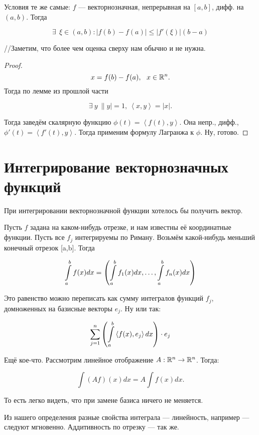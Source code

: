 \documentclass[12pt]{report}
\begin{document}
\begin{thm}
Условия те же самые: $f$ --- векторнозначная, непрерывная на $[a,b]$, дифф. на $(a,b)$. Тогда

$$\exists \ \ \xi \in (a,b) : |f(b)-f(a)| \le |f'(\xi)|(b-a)$$

//Заметим, что более чем оценка сверху нам обычно и не нужна.
\end{thm}
\begin{proof}
$$x = f(b)-f(a),\ \ x \in \mathbb{R}^n.$$
Тогда по лемме из прошлой части

$$\exists \ y\ \|y|=1,\ \left<x,y\right>=|x|.$$

Тогда заведём скалярную функцию $\phi(t) = \left<f(t),y\right>$. Она непр., дифф., $\phi'(t) = \left<f'(t),y\right>$. Тогда применим формулу Лагранжа к $\phi$. Ну, готово.
\end{proof}

\section{Интегрирование векторнозначных функций}

При интегрировании векторнозначной функции хотелось бы получить вектор.

\begin{defn}
Пусть $f$ задана на каком-нибудь отрезке, и нам известны её координатные функции. Пусть все $f_j$ интегрируемы по Риману. Возьмём какой-нибудь меньший конечный отрезок [a,b]. Тогда

$$\int\limits_{a}^{b}{f(x)dx}= \left(\int\limits_{a}^{b}{f_1(x)dx},\ldots,\int\limits_{a}^{b}{f_n(x)dx}\right)$$

Это равенство можно переписать как сумму интегралов функций $f_j$, домноженных на базисные векторы $e_j$. Ну или так:

$$\sum\limits_{j=1}^{n}{\left(\int\limits_{a}^{b}{\left<f(x),e_j\right>dx}\right)}  \cdot e_j$$

Ещё кое-что. Рассмотрим линейное отображение $A: \mathbb{R}^n \to \mathbb{R}^n$. Тогда:

$$\int{(Af)(x)dx}= A \int{f(x)dx}.$$

То есть легко видеть, что при замене базиса ничего не меняется.
\end{defn}

\begin{cor} Из нашего определения разные свойства интеграла --- линейность, например --- следуют мгновенно. Аддитивность по отрезку --- так же. 
\end{cor}
\end{document}
